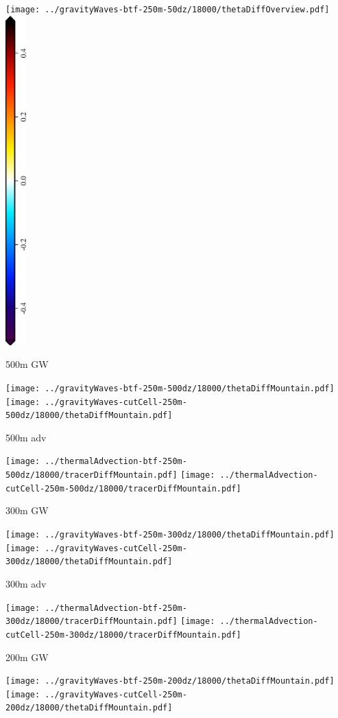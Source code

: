 \documentclass{article}
\begin{document}
\centering
\texttt{[image: ../gravityWaves-btf-250m-50dz/18000/thetaDiffOverview.pdf]} \\
\includegraphics[height=5in,angle=270]{thetaDiffOverview_theta_diff.eps}

\newpage
500m GW

\texttt{[image: ../gravityWaves-btf-250m-500dz/18000/thetaDiffMountain.pdf]}
\texttt{[image: ../gravityWaves-cutCell-250m-500dz/18000/thetaDiffMountain.pdf]}

500m adv

\texttt{[image: ../thermalAdvection-btf-250m-500dz/18000/tracerDiffMountain.pdf]}
\texttt{[image: ../thermalAdvection-cutCell-250m-500dz/18000/tracerDiffMountain.pdf]}

\newpage
300m GW

\texttt{[image: ../gravityWaves-btf-250m-300dz/18000/thetaDiffMountain.pdf]}
\texttt{[image: ../gravityWaves-cutCell-250m-300dz/18000/thetaDiffMountain.pdf]}

300m adv

\texttt{[image: ../thermalAdvection-btf-250m-300dz/18000/tracerDiffMountain.pdf]}
\texttt{[image: ../thermalAdvection-cutCell-250m-300dz/18000/tracerDiffMountain.pdf]}

\newpage
200m GW

\texttt{[image: ../gravityWaves-btf-250m-200dz/18000/thetaDiffMountain.pdf]}
\texttt{[image: ../gravityWaves-cutCell-250m-200dz/18000/thetaDiffMountain.pdf]}
\end{document}
